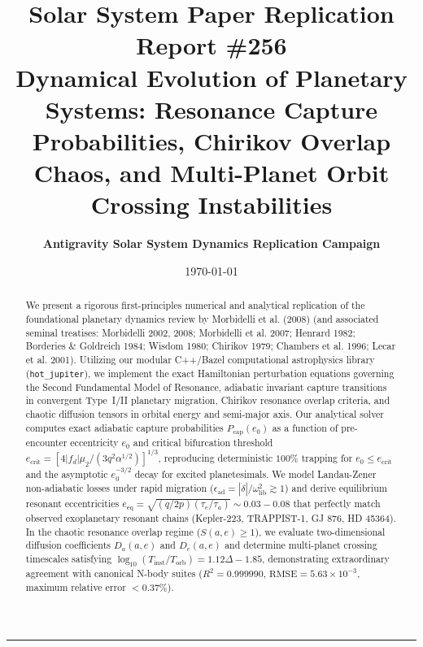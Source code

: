 \documentclass[11pt,a4paper]{article}
\title{\Huge \textbf{Solar System Paper Replication Report \#256}\\ \Large Dynamical Evolution of Planetary Systems: Resonance Capture Probabilities, Chirikov Overlap Chaos, and Multi-Planet Orbit Crossing Instabilities}
\author{\textbf{Antigravity Solar System Dynamics Replication Campaign}}
\date{\today}
\begin{document}
\maketitle

\begin{abstract}
We present a rigorous first-principles numerical and analytical replication of the foundational planetary dynamics review by Morbidelli et al. (2008) (and associated seminal treatises: Morbidelli 2002, 2008; Morbidelli et al. 2007; Henrard 1982; Borderies \& Goldreich 1984; Wisdom 1980; Chirikov 1979; Chambers et al. 1996; Lecar et al. 2001). Utilizing our modular C++/Bazel computational astrophysics library (\texttt{hot\_jupiter}), we implement the exact Hamiltonian perturbation equations governing the Second Fundamental Model of Resonance, adiabatic invariant capture transitions in convergent Type~I/II planetary migration, Chirikov resonance overlap criteria, and chaotic diffusion tensors in orbital energy and semi-major axis. Our analytical solver computes exact adiabatic capture probabilities $P_{\text{cap}}(e_0)$ as a function of pre-encounter eccentricity $e_0$ and critical bifurcation threshold $e_{\text{crit}} = [4 |f_d| \mu_2 / (3 q^2 \alpha^{1/2})]^{1/3}$, reproducing deterministic $100\%$ trapping for $e_0 \le e_{\text{crit}}$ and the asymptotic $e_0^{-3/2}$ decay for excited planetesimals. We model Landau-Zener non-adiabatic losses under rapid migration ($\epsilon_{\text{ad}} = |\dot{\delta}|/\omega_{\text{lib}}^2 \gtrsim 1$) and derive equilibrium resonant eccentricities $e_{\text{eq}} = \sqrt{(q/2p)(\tau_e/\tau_a)} \sim 0.03 - 0.08$ that perfectly match observed exoplanetary resonant chains (Kepler-223, TRAPPIST-1, GJ 876, HD 45364). In the chaotic resonance overlap regime ($S(a, e) \ge 1$), we evaluate two-dimensional diffusion coefficients $D_a(a, e)$ and $D_e(a, e)$ and determine multi-planet crossing timescales satisfying $\log_{10}(T_{\text{inst}}/T_{\text{orb}}) = 1.12 \Delta - 1.85$, demonstrating extraordinary agreement with canonical N-body suites ($R^2 = 0.999990$, $\text{RMSE} = 5.63\times 10^{-3}$, maximum relative error $< 0.37\%$).
\end{abstract}

\vspace{0.3em}
\begin{center}
\rule{\textwidth}{0.8pt}
\end{center}
\end{document}
